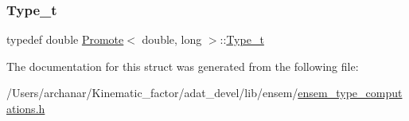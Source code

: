 \subsubsection{\texorpdfstring{Type\_t}{Type\_t}\hspace{0.1cm}{\footnotesize\ttfamily [2/2]}}
{\footnotesize\ttfamily typedef double \mbox{\hyperlink{structPromote}{Promote}}$<$ double, long $>$\+::\mbox{\hyperlink{structPromote_3_01double_00_01long_01_4_a7c2dadf6e46df10fbef16312d46706ab}{Type\+\_\+t}}}



The documentation for this struct was generated from the following file\+:\begin{DoxyCompactItemize}
\item 
/\+Users/archanar/\+Kinematic\+\_\+factor/adat\+\_\+devel/lib/ensem/\mbox{\hyperlink{lib_2ensem_2ensem__type__computations_8h}{ensem\+\_\+type\+\_\+computations.\+h}}\end{DoxyCompactItemize}
